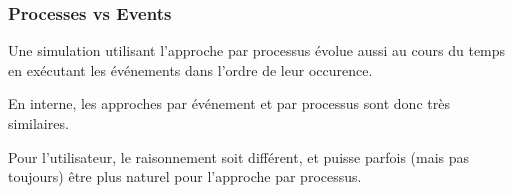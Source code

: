 \documentclass[t,usepdftitle=false]{beamer}
\begin{document}
\begin{frame}
\frametitle{Processes vs Events}

Une simulation utilisant l'approche par processus évolue aussi au
cours du temps en exécutant les événements dans l'ordre de leur
occurence.

\mbox{}

En interne, les approches par événement et par processus sont donc
très similaires.

\mbox{}

Pour l'utilisateur, le raisonnement soit
différent, et puisse parfois (mais pas toujours) être plus naturel pour l'approche par processus.



\end{frame}
\end{document}
